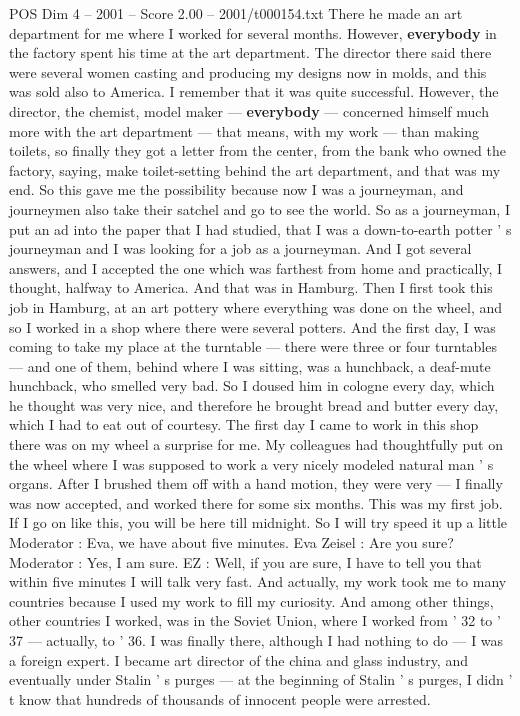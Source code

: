 \begin{textsample}{POS Dim 4 – 2001 – Score 2.00 – 2001/t000154.txt}
There he made an art department for me where I worked for several months.
However, \textbf{everybody} in the factory spent his time at the art department.
The director there said there were several women casting and producing my designs now in molds, and this was sold also to America.
I remember that it was quite successful.
However, the director, the chemist, model maker — \textbf{everybody} — concerned himself much more with the art department — that means, with my work — than making toilets, so finally they got a letter from the center, from the bank who owned the factory, saying, make toilet-setting behind the art department, and that was my end.
So this gave me the possibility because now I was a journeyman, and journeymen also take their satchel and go to see the world.
So as a journeyman, I put an ad into the paper that I had studied, that I was a down-to-earth potter ' s journeyman and I was looking for a job as a journeyman.
And I got several answers, and I accepted the one which was farthest from home and practically, I thought, halfway to America.
And that was in Hamburg.
Then I first took this job in Hamburg, at an art pottery where everything was done on the wheel, and so I worked in a shop where there were several potters.
And the first day, I was coming to take my place at the turntable — there were three or four turntables — and one of them, behind where I was sitting, was a hunchback, a deaf-mute hunchback, who smelled very bad.
So I doused him in cologne every day, which he thought was very nice, and therefore he brought bread and butter every day, which I had to eat out of courtesy.
The first day I came to work in this shop there was on my wheel a surprise for me.
My colleagues had thoughtfully put on the wheel where I was supposed to work a very nicely modeled natural man ' s organs.
After I brushed them off with a hand motion, they were very — I finally was now accepted, and worked there for some six months.
This was my first job.
If I go on like this, you will be here till midnight.
So I will try speed it up a little Moderator : Eva, we have about five minutes.
Eva Zeisel : Are you sure?
Moderator : Yes, I am sure.
EZ : Well, if you are sure, I have to tell you that within five minutes I will talk very fast.
And actually, my work took me to many countries because I used my work to fill my curiosity.
And among other things, other countries I worked, was in the Soviet Union, where I worked from ' 32 to ' 37 — actually, to ' 36.
I was finally there, although I had nothing to do — I was a foreign expert.
I became art director of the china and glass industry, and eventually under Stalin ' s purges — at the beginning of Stalin ' s purges, I didn ' t know that hundreds of thousands of innocent people were arrested.

\end{textsample}
